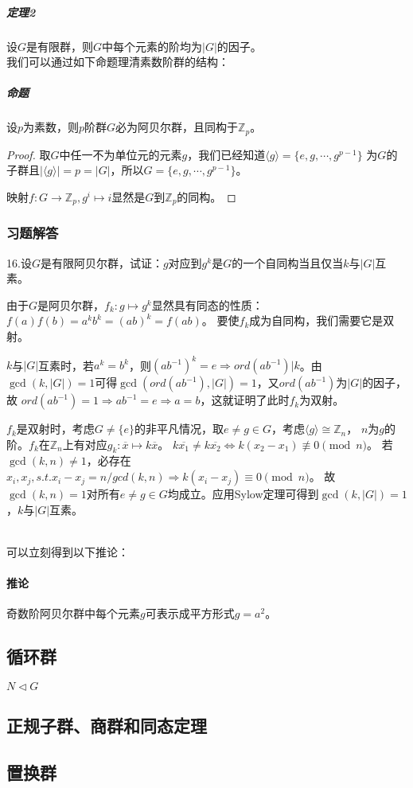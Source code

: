 \documentclass{article}
\begin{document}
\subparagraph{定理2} 设$G$是有限群，则$G$中每个元素的阶均为$|G|$的因子。\\

我们可以通过如下命题理清素数阶群的结构：

\subparagraph{命题} 设$p$为素数，则$p$阶群$G$必为阿贝尔群，且同构于$\mathbb{Z}_p$。

\begin{proof}
    取$G$中任一不为单位元的元素$g$，我们已经知道$\langle g \rangle=\{ e,g,\cdots,g^{p-1}\}$
    为$G$的子群且$|\langle g \rangle|=p=|G|$，所以$G=\{ e,g,\cdots,g^{p-1} \}$。

    映射$f:G \to \mathbb{Z}_p, g^i \mapsto i$显然是$G$到$\mathbb{Z}_p$的同构。
\end{proof}

\subsubsection*{习题解答}
16.设$G$是有限阿贝尔群，试证：$g$对应到$g^k$是$G$的一个自同构当且仅当$k$与$|G|$互素。

由于$G$是阿贝尔群，$f_k: g \mapsto g^k$显然具有同态的性质：$f(a)f(b)=a^kb^k=(ab)^k=f(ab)$。
要使$f_k$成为自同构，我们需要它是双射。

$k$与$|G|$互素时，若$a^k=b^k$，则$(ab^{-1})^k=e \Rightarrow ord(ab^{-1}) | k$。由
$\gcd(k,|G|)=1$可得$\gcd(ord(ab^{-1}), |G|)=1$，又$ord(ab^{-1})$为$|G|$的因子，故
$ord(ab^{-1})=1 \Rightarrow ab^{-1}=e \Rightarrow a=b$，这就证明了此时$f_k$为双射。

$f_k$是双射时，考虑$G \neq \{e\}$的非平凡情况，取$e \neq g \in G$，考虑$\langle g \rangle \cong \mathbb{Z}_n$，
$n$为$g$的阶。$f_k$在$\mathbb{Z}_n$上有对应$g_k:\overline{x} \mapsto k\overline{x}$。
$k\overline{x_1} \neq k\overline{x_2} \Leftrightarrow k(x_2-x_1) \not\equiv 0 \pmod{n}$。
若$\gcd(k,n) \neq 1$，必存在$x_i,x_j, s.t. x_i-x_j=n/gcd(k,n) \Rightarrow k(x_i-x_j) \equiv 0 \pmod{n}$。
故$\gcd(k,n)=1$对所有$e \neq g \in G$均成立。应用Sylow定理可得到$\gcd(k,|G|)=1$，$k$与$|G|$互素。

~\\
可以立刻得到以下推论：
\paragraph{推论} 奇数阶阿贝尔群中每个元素$g$可表示成平方形式$g=a^2$。

\subsection{循环群}

$N\lhd G$

\subsection{正规子群、商群和同态定理}

\subsection{置换群}
\end{document}
